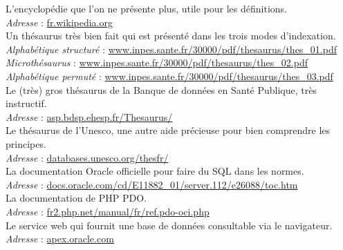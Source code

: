 \documentclass[a4paper, 12pt]{report}
\begin{document}
\renewcommand\bibname{Webographie}%
\begin{thebibliography}{2}
	L'encyclopédie que l'on ne présente plus, utile pour les définitions.\\
	\emph{Adresse} : \url{fr.wikipedia.org}
	~\\
	Un thésaurus très bien fait qui est présenté dans les trois modes d'indexation.\\
	\emph{Alphabétique structuré} : \url{www.inpes.sante.fr/30000/pdf/thesaurus/thes\_01.pdf}\\
	\emph{Microthésaurus} : \url{www.inpes.sante.fr/30000/pdf/thesaurus/thes\_02.pdf}\\
	\emph{Alphabétique permuté} : \url{www.inpes.sante.fr/30000/pdf/thesaurus/thes\_03.pdf}
	~\\
	Le (très) gros thésaurus de la Banque de données en Santé Publique, très instructif.\\
	\emph{Adresse} : \url{asp.bdsp.ehesp.fr/Thesaurus/}
	~\\
	Le thésaurus de l'Unesco, une autre aide précieuse pour bien comprendre les principes.\\
	\emph{Adresse} : \url{databases.unesco.org/thesfr/}
	~\\
	La documentation Oracle officielle pour faire du SQL dans les normes.\\
	\emph{Adresse} : \url{docs.oracle.com/cd/E11882_01/server.112/e26088/toc.htm}
	~\\
	\label{claque}
	La documentation de PHP PDO.\\
	\emph{Adresse} : \url{fr2.php.net/manual/fr/ref.pdo-oci.php}
	~\\
	\label{cloche}
	Le service web qui fournit une base de données consultable via le navigateur.\\
	\emph{Adresse} : \url{apex.oracle.com}
\end{thebibliography}
\end{document}

